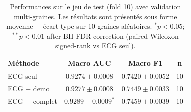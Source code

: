 \begin{table}[htbp]
\centering
\caption{Performances sur le jeu de test (fold 10) avec validation multi-graines. Les résultats sont présentés sous forme moyenne $\pm$ écart-type sur 10 graines aléatoires. $^*p < 0.05$; $^{**}p < 0.01$ after BH-FDR correction (paired Wilcoxon signed-rank vs ECG seul).}
\label{tab:results_multiseed}
\begin{tabular}{lccc}
\toprule
\textbf{Méthode} & \textbf{Macro AUC} & \textbf{Macro F1} & \textbf{n} \\
\midrule
ECG seul & $0.9274 \pm 0.0008$ & $0.7420 \pm 0.0052$ & 10 \\
ECG + demo & $0.9277 \pm 0.0008$ & $0.7449 \pm 0.0033$ & 10 \\
ECG + complet & $0.9289 \pm 0.0009$$^{*}$ & $0.7459 \pm 0.0039$ & 10 \\
\bottomrule
\end{tabular}
\end{table}